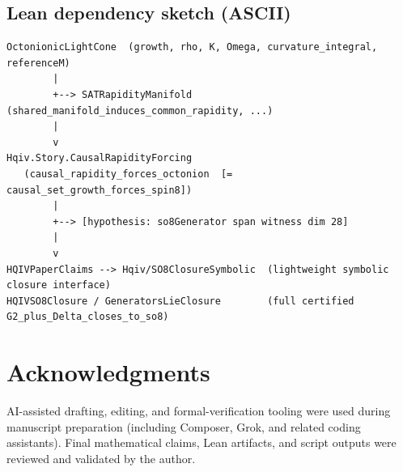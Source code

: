 \documentclass[11pt]{amsart}
\begin{document}
\subsection{Lean dependency sketch (ASCII)}
\label{app:lean-deps}
\begin{verbatim}
OctonionicLightCone  (growth, rho, K, Omega, curvature_integral, referenceM)
        |
        +--> SATRapidityManifold (shared_manifold_induces_common_rapidity, ...)
        |
        v
Hqiv.Story.CausalRapidityForcing
   (causal_rapidity_forces_octonion  [= causal_set_growth_forces_spin8])
        |
        +--> [hypothesis: so8Generator span witness dim 28]
        |
        v
HQIVPaperClaims --> Hqiv/SO8ClosureSymbolic  (lightweight symbolic closure interface)
HQIVSO8Closure / GeneratorsLieClosure        (full certified G2_plus_Delta_closes_to_so8)
\end{verbatim}

\section*{Acknowledgments}
AI-assisted drafting, editing, and formal-verification tooling were used during manuscript preparation (including Composer, Grok, and related coding assistants). Final mathematical claims, Lean artifacts, and script outputs were reviewed and validated by the author.
\end{document}
